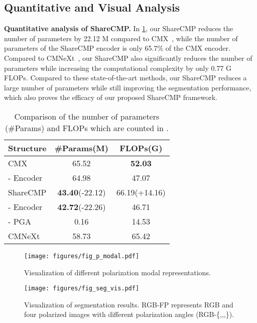 \documentclass[10pt,twocolumn,letterpaper]{article}
\begin{document}
\subsection{Quantitative and Visual Analysis}
\label{sec:qv_analysis}


\noindent
\textbf{Quantitative analysis of ShareCMP.}
In \cref{tab:PF}, our ShareCMP reduces the number of parameters by 22.12 M compared to CMX~\cite{cmx}, while the number of parameters of the ShareCMP encoder is only 65.7\% of the CMX encoder. Compared to CMNeXt~\cite{cmnext}, our ShareCMP also significantly reduces the number of parameters while increasing the computational complexity by only 0.77 G FLOPs. Compared to these state-of-the-art methods, our ShareCMP reduces a large number of parameters while still improving the segmentation performance, which also proves the efficacy of our proposed ShareCMP framework.
\begin{table}[t]
\centering


\begin{tabular}{@{}lcc@{}}
\toprule
Structure & \#Params(M) & FLOPs(G) \\ \midrule
CMX~\cite{cmx}       & 65.52                           & \textbf{52.03}         \\ \hdashline
\quad- Encoder       & 64.98                           & 47.07                  \\ \midrule
ShareCMP             & \textbf{43.40}{\small (-22.12)} & 66.19{\small (+14.16)} \\ \hdashline
\quad- Encoder       & \textbf{42.72}{\small (-22.26)} & 46.71                  \\
\quad- PGA           & 0.16                            & 14.53                  \\ \midrule
CMNeXt~\cite{cmnext} & 58.73                           & 65.42                  \\ \bottomrule
\end{tabular}

\caption{Comparison of the number of parameters (\#Params) and FLOPs which are counted in .}
  \label{tab:PF}
\end{table} \begin{figure*}[t]
  \centering
   \texttt{[image: figures/fig\_p\_modal.pdf]}
   \caption{Visualization of different polarization modal representations.}
   \label{fig:p_modal}
\end{figure*} \begin{figure}[t]
  \centering
   \texttt{[image: figures/fig\_seg\_vis.pdf]}
   \caption{Visualization of segmentation results. RGB-FP represents RGB and four polarized images with different polarization angles (RGB-\{,,,\}).}
   \label{fig:seg_vis}
\end{figure} \newline
\end{document}
